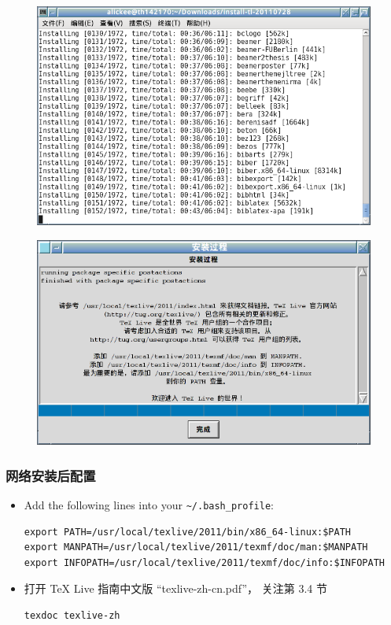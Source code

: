 \documentclass{beamer}
\def\TeXLive{\TeX{} Live\xspace}
\begin{document}
\begin{frame}
  \begin{figure}[h]
  \centering
\includegraphics[scale=0.45]{term.png}
  \end{figure}
\end{frame}

\begin{frame}
  \begin{figure}[h]
  \centering
\includegraphics[scale=0.5]{安装过程.png}
  \end{figure}
\end{frame}

\begin{frame}[fragile]
  \frametitle{网络安装后配置}
\begin{itemize}
  \item 
    Add the following lines into your \nolinkurl{~/.bash_profile}:
    \begin{lstlisting}
export PATH=/usr/local/texlive/2011/bin/x86_64-linux:$PATH
export MANPATH=/usr/local/texlive/2011/texmf/doc/man:$MANPATH
export INFOPATH=/usr/local/texlive/2011/texmf/doc/info:$INFOPATH
    \end{lstlisting}

  \item 
打开 \TeXLive 指南中文版 ``texlive-zh-cn.pdf''，
关注第 3.4 节
  \begin{lstlisting}
texdoc texlive-zh
  \end{lstlisting}

\end{itemize}
\end{frame}
\end{document}
